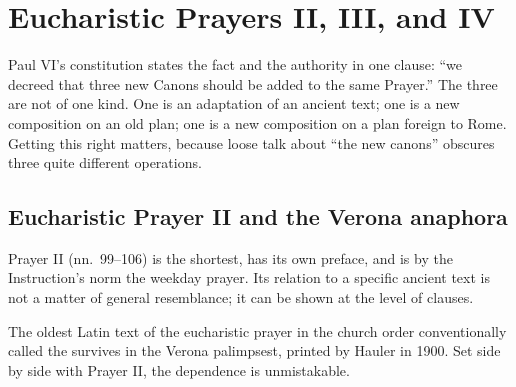 \section{Eucharistic Prayers II, III, and IV}

Paul VI's constitution states the fact and the authority in one clause: ``we decreed that three
new Canons should be added to the same Prayer.'' The
three are not of one kind. One is an adaptation of an ancient text; one is a new composition on
an old plan; one is a new composition on a plan foreign to Rome. Getting this right matters,
because loose talk about ``the new canons'' obscures three quite different operations.

\subsection{Eucharistic Prayer II and the Verona anaphora}

Prayer II (nn.\ 99--106) is the shortest, has its own preface, and is by the Instruction's norm
the weekday prayer. Its relation to a specific ancient text is not a matter of general
resemblance; it can be shown at the level of clauses.

The oldest Latin text of the eucharistic prayer in the church order conventionally called the
 survives in the Verona palimpsest, printed by Hauler in 1900. Set
side by side with Prayer II, the dependence is unmistakable.

